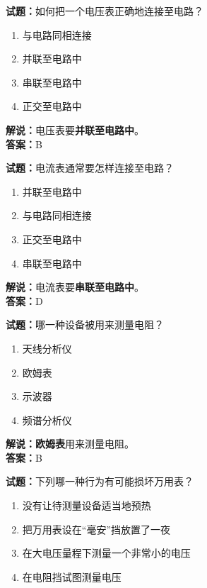 \documentclass{ctexbook}
\begin{document}
\bigskip


\noindent\textbf{试题：}如何把一个电压表正确地连接至电路？

\begin{enumerate}[leftmargin=3em]
	\item 与电路同相连接
	\item 并联至电路中
	\item 串联至电路中
	\item 正交至电路中
\end{enumerate}

\noindent\textbf{解说：}电压表要\textbf{并联至电路中}。\\\noindent\textbf{答案：}B

\bigskip


\noindent\textbf{试题：}电流表通常要怎样连接至电路？

\begin{enumerate}[leftmargin=3em]
	\item 并联至电路中
	\item 与电路同相连接
	\item 正交至电路中
	\item 串联至电路中
\end{enumerate}

\noindent\textbf{解说：}电流表要\textbf{串联至电路中}。\\\noindent\textbf{答案：}D


\bigskip


\noindent\textbf{试题：}哪一种设备被用来测量电阻？

\begin{enumerate}[leftmargin=3em]
	\item 天线分析仪
	\item 欧姆表
	\item 示波器
	\item 频谱分析仪
\end{enumerate}

\noindent\textbf{解说：欧姆表}用来测量电阻。\\\noindent\textbf{答案：}B


\bigskip


\noindent\textbf{试题：}下列哪一种行为有可能损坏万用表？

\begin{enumerate}[leftmargin=3em]
	\item 没有让待测量设备适当地预热
	\item 把万用表设在“毫安”挡放置了一夜
	\item 在大电压量程下测量一个非常小的电压
	\item 在电阻挡试图测量电压
\end{enumerate}
\end{document}
